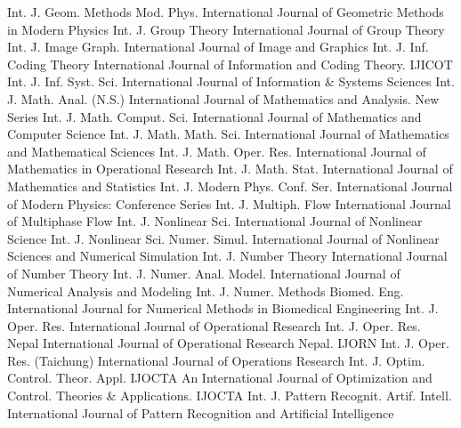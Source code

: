 {Int. J. Geom. Methods Mod. Phys.}
{International Journal of Geometric Methods in Modern Physics}
{Int. J. Group Theory}
{International Journal of Group Theory}
{Int. J. Image Graph.}
{International Journal of Image and Graphics}
{Int. J. Inf. Coding Theory}
{International Journal of Information and Coding Theory. IJICOT}
{Int. J. Inf. Syst. Sci.}
{International Journal of Information & Systems Sciences}
{Int. J. Math. Anal. (N.S.)}
{International Journal of Mathematics and Analysis. New Series}
{Int. J. Math. Comput. Sci.}
{International Journal of Mathematics and Computer Science}
{Int. J. Math. Math. Sci.}
{International Journal of Mathematics and Mathematical Sciences}
{Int. J. Math. Oper. Res.}
{International Journal of Mathematics in Operational Research}
{Int. J. Math. Stat.}
{International Journal of Mathematics and Statistics}
{Int. J. Modern Phys. Conf. Ser.}
{International Journal of Modern Physics: Conference Series}
{Int. J. Multiph. Flow}
{International Journal of Multiphase Flow}
{Int. J. Nonlinear Sci.}
{International Journal of Nonlinear Science}
{Int. J. Nonlinear Sci. Numer. Simul.}
{International Journal of Nonlinear Sciences and Numerical Simulation}
{Int. J. Number Theory}
{International Journal of Number Theory}
{Int. J. Numer. Anal. Model.}
{International Journal of Numerical Analysis and Modeling}
{Int. J. Numer. Methods Biomed. Eng.}
{International Journal for Numerical Methods in Biomedical Engineering}
{Int. J. Oper. Res.}
{International Journal of Operational Research}
{Int. J. Oper. Res. Nepal}
{International Journal of Operational Research Nepal. IJORN}
{Int. J. Oper. Res. (Taichung)}
{International Journal of Operations Research}
{Int. J. Optim. Control. Theor. Appl. IJOCTA}
{An International Journal of Optimization and Control. Theories & Applications. IJOCTA}
{Int. J. Pattern Recognit. Artif. Intell.}
{International Journal of Pattern Recognition and Artificial Intelligence}
